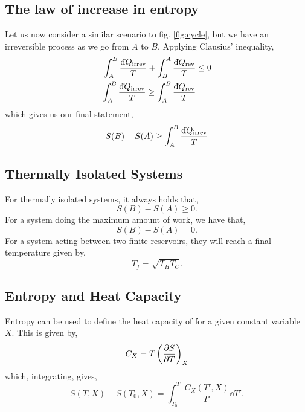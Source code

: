 \documentclass{book}
\newcommand{\dbar}{\mathrm{d}\hspace*{-0.08em}\bar{}\hspace*{0.1em}}
\begin{document}
\subsection{The law of increase in entropy}
Let us now consider a similar scenario to fig. \ref{fig:cycle}, but we have an irreversible process as we go from $A$ to $B$. Applying Clausius' inequality,
\begin{equation}
	\begin{split}
		\int_A^B \frac{\dbar Q_{\text{irrev}}}{T} + \int_B^A \frac{\dbar Q_{\text{rev}}}{T} & \leq 0\\
		\int_A^B\frac{\dbar Q_{\text{irrev}}}{T} \geq \int_A^B\frac{\dbar Q_{\text{rev}}}{T}
	\end{split}
\end{equation}
which gives us our final statement,
\begin{equation}
	S(B) - S(A) \geq \int_A^B \frac{\dbar Q_{\text{irrev}}}{T}
\end{equation}
\subsection{Thermally Isolated Systems}
For thermally isolated systems, it always holds that,
\begin{equation}
	S(B) - S(A) \geq 0.
\end{equation}
For a system doing the maximum amount of work, we have that,
\begin{equation}
	S(B) - S(A) = 0.
\end{equation}
For a system acting between two finite reservoirs, they will reach a final temperature given by,
\begin{equation}
	T_f = \sqrt{T_HT_C}.
\end{equation}
\subsection{Entropy and Heat Capacity}
Entropy can be used to define the heat capacity of for a given constant variable $X$. This is given by,
\begin{equation}
	C_X = T\left(\pdv{S}{T}\right)_X
\end{equation}
which, integrating, gives,
\begin{equation}
	S(T,X) - S(T_0, X) = \int_{T_0}^T \frac{C_X(T', X)}{T'}\dd{T'}.
\end{equation}
\end{document}
